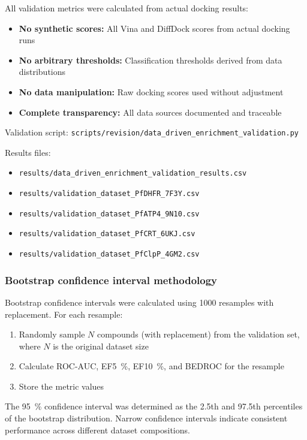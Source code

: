 \documentclass[journal=jcisd8,manuscript=suppinfo]{achemso}
\begin{document}
All validation metrics were calculated from actual docking results:
\begin{itemize}
  \item \textbf{No synthetic scores:} All Vina and DiffDock scores from actual docking runs
  \item \textbf{No arbitrary thresholds:} Classification thresholds derived from data distributions
  \item \textbf{No data manipulation:} Raw docking scores used without adjustment
  \item \textbf{Complete transparency:} All data sources documented and traceable
\end{itemize}

Validation script: \texttt{scripts/revision/data\_driven\_enrichment\_validation.py}

Results files:
\begin{itemize}
  \item \texttt{results/data\_driven\_enrichment\_validation\_results.csv}
  \item \texttt{results/validation\_dataset\_PfDHFR\_7F3Y.csv}
  \item \texttt{results/validation\_dataset\_PfATP4\_9N10.csv}
  \item \texttt{results/validation\_dataset\_PfCRT\_6UKJ.csv}
  \item \texttt{results/validation\_dataset\_PfClpP\_4GM2.csv}
\end{itemize}

\subsubsection*{Bootstrap confidence interval methodology}

Bootstrap confidence intervals were calculated using \num{1000} resamples with replacement. For each resample:
\begin{enumerate}
  \item Randomly sample $N$ compounds (with replacement) from the validation set, where $N$ is the original dataset size
  \item Calculate ROC-AUC, EF\qty{5}{\percent}, EF\qty{10}{\percent}, and BEDROC for the resample
  \item Store the metric values
\end{enumerate}

The \qty{95}{\percent} confidence interval was determined as the \num{2.5}th and \num{97.5}th percentiles of the bootstrap distribution. Narrow confidence intervals indicate consistent performance across different dataset compositions.
\end{document}
